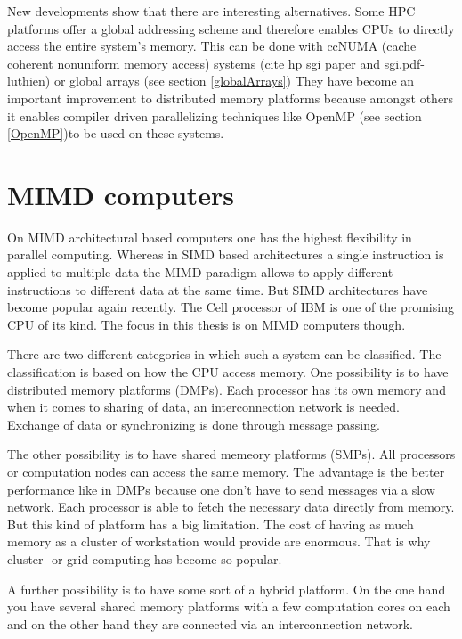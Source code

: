 New developments show that there are interesting alternatives. Some
HPC platforms offer a global addressing scheme and therefore enables
CPUs to directly access the entire system's memory. This can be done
with ccNUMA (cache coherent nonuniform memory access) systems (cite hp
sgi paper and sgi.pdf-luthien) or
global arrays (see section \ref{globalArrays})
They have become an important improvement to distributed memory
platforms because amongst others it enables compiler driven
parallelizing techniques like OpenMP (see section \ref{OpenMP})to be
used on these systems. 

\section{MIMD computers}
\label{sec:mimd_computers}

On MIMD architectural based computers one has the highest flexibility
in parallel computing. Whereas in SIMD based architectures a single
instruction is applied to multiple data the MIMD paradigm allows to
apply different instructions to different data at the same time. But
SIMD architectures have become popular again recently. The Cell
processor of IBM is one of the promising CPU of its kind. The focus in
this thesis is on MIMD computers though.

There are two different categories in which such a system can be
classified. The classification is based on how the CPU access
memory. One possibility is to have distributed memory platforms (DMPs). Each
processor has its own memory and when it comes to sharing of data, an
interconnection network is needed. Exchange of data or synchronizing
is done through message passing.

The other possibility is to have shared memeory platforms (SMPs). All
processors or computation nodes can access the same memory. The
advantage is the better performance like in DMPs because one don't
have to send messages via a slow network. Each processor is able to
fetch the necessary data directly from memory. But this kind of platform
has a big limitation. The cost of having as much memory as a cluster
of workstation would provide are enormous. That is why cluster- or
grid-computing has become so popular.

A further possibility is to have some sort of a hybrid platform. On
the one hand you have several shared memory platforms with a few
computation cores on each and on the other hand they are connected via
an interconnection network. 

